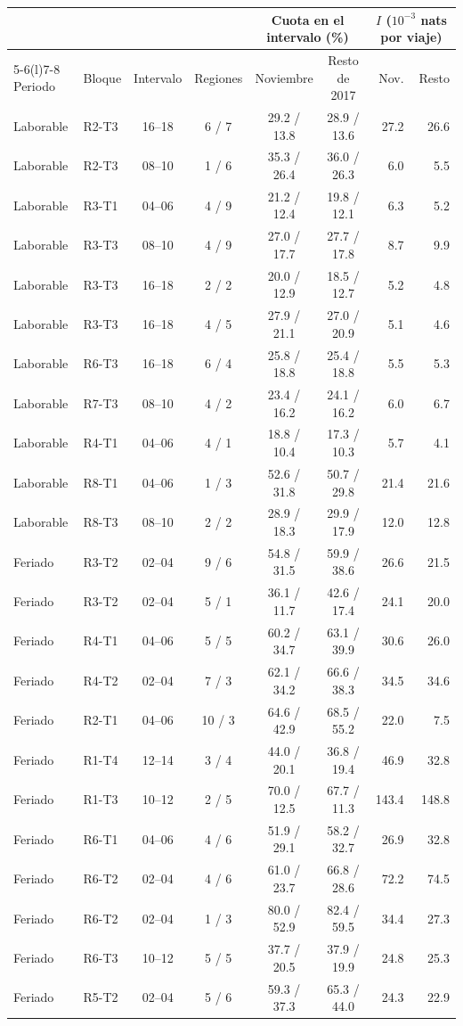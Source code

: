 \begin{tabular}{@{}llccccrr@{}}
\toprule
 & & & & \multicolumn{2}{c}{Cuota en el intervalo (\%)} & \multicolumn{2}{c}{$I$ ($10^{-3}$ nats por viaje)} \\
\cmidrule(lr){5-6}\cmidrule(l){7-8}
Periodo & Bloque & Intervalo & Regiones & Noviembre & Resto de 2017 & Nov. & Resto \\
\midrule
Laborable & R2-T3 & 16--18 & 6 / 7 & 29.2 / 13.8 & 28.9 / 13.6 & 27.2 & 26.6 \\
Laborable & R2-T3 & 08--10 & 1 / 6 & 35.3 / 26.4 & 36.0 / 26.3 & 6.0 & 5.5 \\
Laborable & R3-T1 & 04--06 & 4 / 9 & 21.2 / 12.4 & 19.8 / 12.1 & 6.3 & 5.2 \\
Laborable & R3-T3 & 08--10 & 4 / 9 & 27.0 / 17.7 & 27.7 / 17.8 & 8.7 & 9.9 \\
Laborable & R3-T3 & 16--18 & 2 / 2 & 20.0 / 12.9 & 18.5 / 12.7 & 5.2 & 4.8 \\
Laborable & R3-T3 & 16--18 & 4 / 5 & 27.9 / 21.1 & 27.0 / 20.9 & 5.1 & 4.6 \\
Laborable & R6-T3 & 16--18 & 6 / 4 & 25.8 / 18.8 & 25.4 / 18.8 & 5.5 & 5.3 \\
Laborable & R7-T3 & 08--10 & 4 / 2 & 23.4 / 16.2 & 24.1 / 16.2 & 6.0 & 6.7 \\
Laborable & R4-T1 & 04--06 & 4 / 1 & 18.8 / 10.4 & 17.3 / 10.3 & 5.7 & 4.1 \\
Laborable & R8-T1 & 04--06 & 1 / 3 & 52.6 / 31.8 & 50.7 / 29.8 & 21.4 & 21.6 \\
Laborable & R8-T3 & 08--10 & 2 / 2 & 28.9 / 18.3 & 29.9 / 17.9 & 12.0 & 12.8 \\
Feriado & R3-T2 & 02--04 & 9 / 6 & 54.8 / 31.5 & 59.9 / 38.6 & 26.6 & 21.5 \\
Feriado & R3-T2 & 02--04 & 5 / 1 & 36.1 / 11.7 & 42.6 / 17.4 & 24.1 & 20.0 \\
Feriado & R4-T1 & 04--06 & 5 / 5 & 60.2 / 34.7 & 63.1 / 39.9 & 30.6 & 26.0 \\
Feriado & R4-T2 & 02--04 & 7 / 3 & 62.1 / 34.2 & 66.6 / 38.3 & 34.5 & 34.6 \\
Feriado & R2-T1 & 04--06 & 10 / 3 & 64.6 / 42.9 & 68.5 / 55.2 & 22.0 & 7.5 \\
Feriado & R1-T4 & 12--14 & 3 / 4 & 44.0 / 20.1 & 36.8 / 19.4 & 46.9 & 32.8 \\
Feriado & R1-T3 & 10--12 & 2 / 5 & 70.0 / 12.5 & 67.7 / 11.3 & 143.4 & 148.8 \\
Feriado & R6-T1 & 04--06 & 4 / 6 & 51.9 / 29.1 & 58.2 / 32.7 & 26.9 & 32.8 \\
Feriado & R6-T2 & 02--04 & 4 / 6 & 61.0 / 23.7 & 66.8 / 28.6 & 72.2 & 74.5 \\
Feriado & R6-T2 & 02--04 & 1 / 3 & 80.0 / 52.9 & 82.4 / 59.5 & 34.4 & 27.3 \\
Feriado & R6-T3 & 10--12 & 5 / 5 & 37.7 / 20.5 & 37.9 / 19.9 & 24.8 & 25.3 \\
Feriado & R5-T2 & 02--04 & 5 / 6 & 59.3 / 37.3 & 65.3 / 44.0 & 24.3 & 22.9 \\
\bottomrule
\end{tabular}
